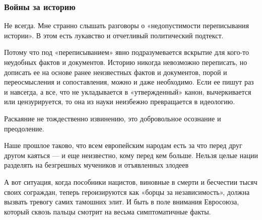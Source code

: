  
 
 
 
 

\subsubsection{Войны за историю}


Не всегда. Мне странно слышать разговоры о «недопустимости переписывания
истории». В этом есть лукавство и отчетливый политический подтекст.

Потому что под «переписыванием» явно подразумевается вскрытие для кого-то
неудобных фактов и документов. Историю никогда невозможно переписать, но
дописать ее на основе ранее неизвестных фактов и документов, порой и
переосмысления и сопоставления, можно и даже необходимо. Если ее пишут раз и
навсегда, а все, что не укладывается в «утвержденный» канон, вычеркивается или
цензурируется, то она из науки неизбежно превращается в идеологию.


Раскаяние не тождественно извинению, это добровольное осознание и преодоление.

\begin{leftbar}
	\large
Наше прошлое таково, что всем европейским народам есть за что перед друг
другом каяться — и еще неизвестно, кому перед кем больше. Нельзя целые
нации разделять на безгрешных мучеников и отъявленных злодеев
\end{leftbar}

А вот ситуация, когда пособники нацистов, виновные в смерти и бесчестии тысяч
своих сограждан, теперь героизируются как «борцы за независимость», должна
вызвать тревогу самих тамошних элит. И быть в поле внимания Евросоюза, который
сквозь пальцы смотрит на весьма симптоматичные факты.


